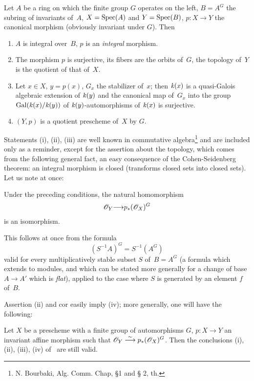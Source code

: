 \begin{proposition}
\label{V.1.1}
Let $A$ be a ring on which the finite group $G$ operates on
the left, $B=A^G$ the subring of invariants of~$A$, $X=\operatorname{Spec}(A)$ and
$Y=\operatorname{Spec}(B)$, $p\colon X\to Y$ the canonical morphism (obviously
invariant under $G$). Then
\begin{enumerate}
\item[(i)] $A$ is integral over~$B$, \ie $p$ is an
\emph{integral} morphism.
\item[(ii)] The morphism $p$ is surjective, its fibers are the
orbits of~$G$, the topology of~$Y$ is the quotient of that of~$X$.
\item[(iii)] Let $x\in X$, $y=p(x)$, $G_x$ the stabilizer of~$x$; then
$\mathit{k}(x)$ is a quasi-Galois algebraic extension of
$\mathit{k}(y)$ and the canonical map of~$G_x$ into the group
$\operatorname{Gal}(\mathit{k}(x)/\mathit{k}(y))$ of $\mathit{k}(y)$-automorphisms of
$\mathit{k}(x)$
is
surjective.
\item[(iv)] $(Y,p)$ is a quotient prescheme of~$X$ by $G$.
\end{enumerate}
\end{proposition}

Statements
(i), (ii), (iii)
are well known in commutative
algebra\footnote{\Cf N. Bourbaki, Alg. Comm. Chap, \S 1 and \S
2, th.} and are included only as a reminder, except for the assertion
about the topology, which comes from the following general fact,
an easy consequence of the Cohen-Seidenberg theorem: an
integral morphism is closed (\ie transforms closed sets into
closed sets). Let us note at once:

\begin{corollary}
\label{V.1.2}
Under the preceding conditions, the natural homomorphism
$$\cal{O}_Y{\to} p_*(\cal{O}_X)^G$$ is an isomorphism.
\end{corollary}

This follows at once from the formula
$$
(S^{-1}A)^G = S^{-1}(A^G)
$$
valid for every multiplicatively stable subset $S$ of~$B=A^G$
(a formula which extends to modules, and which can be stated more generally for
a change of base $A\to A'$ which is \emph{flat}),
applied
to the case where $S$ is generated by an element $f$ of~$B$.

Assertion (ii) and cor\ptbl {} easily imply (iv); more
generally, one will have the following:

\begin{proposition}
\label{V.1.3}
Let
$X$ be a prescheme with a finite group of automorphisms
$G$, $p\colon{}X\to{}Y$ an invariant affine morphism such that
$\cal{O}_Y\isomto p_*(\cal{O}_X)^G$. Then the conclusions
\textup{(i), (ii), (iii), (iv)}
of~ are still valid.
\end{proposition}

